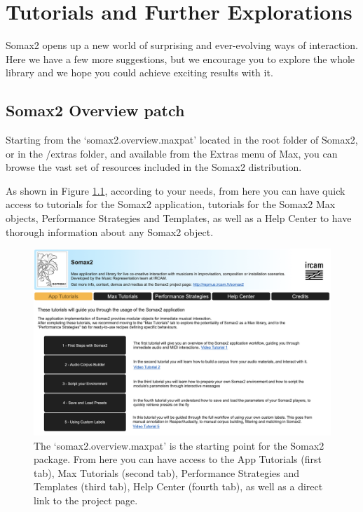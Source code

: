 \chapter{Tutorials and Further Explorations}\label{sec:further}

Somax2 opens up a new world of surprising and ever-evolving ways of interaction. 
Here we have a few more suggestions, but we encourage you to explore the whole library and we hope you could achieve exciting results with it. 

\section{Somax2 Overview patch}

Starting from the `somax2.overview.maxpat' located in the root folder of Somax2, or in the /extras folder, and available from the Extras menu of Max, you can browse the vast set of resources included in the Somax2 distribution. 

As shown in Figure \ref{fig:overview_tutos}, according to your needs, from here you can have quick access to tutorials for the Somax2 application, tutorials for the Somax2 Max objects, Performance Strategies and Templates, as well as a Help Center to have thorough information about any Somax2 object.

\vspace{10mm}

\begin{figure}[H]
    \centering        
 	\includegraphics[width=1\textwidth]{img/somax2_overview.png}
    \caption{The ‘somax2.overview.maxpat’ is the starting point for the Somax2 package. From here you can have access to the App Tutorials (first tab), Max Tutorials (second tab), Performance Strategies and Templates (third tab), Help Center (fourth tab), as well as a direct link to the project page.}
    \label{fig:overview_tutos}
\end{figure}


